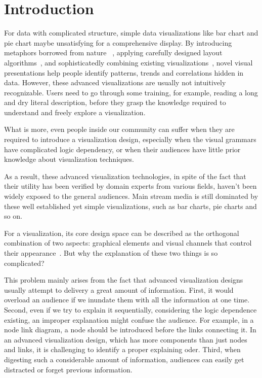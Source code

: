 
\section{Introduction} %
For data with complicated structure, simple data visualizations like bar chart and pie chart maybe unsatisfying for a comprehensive display. By introducing metaphors borrowed from nature ~\cite{cao_whisper:_2012,huron_visual_2013}, applying carefully designed layout algorithms~\cite{wu_opinionflow:_2014,chi_morphable_2015}, and sophisticatedly combining existing visualizations~\cite{zhao_x0023;fluxflow:_2014}, novel visual presentations help people identify patterns, trends and correlations hidden in data. However, these advanced visualizations are usually not intuitively recognizable. Users need to go through some training, for example, reading a long and dry literal description, before they grasp the knowledge required to understand and freely explore a visualization.\par
What is more, even people inside our community can suffer when they are required to introduce a visualization design, especially when the visual grammars have complicated logic dependency, or when their audiences have little prior knowledge about visualization techniques.\par
As a result, these advanced visualization technologies, in spite of
the fact that their utility has been verified by domain experts from various fields, haven't been widely exposed to the general audiences. Main stream media is still dominated by these well established yet simple visualizations, such as bar charts, pie charts and so on.

For a visualization, its core design space can be described as the orthogonal combination of two aspects: graphical elements and visual channels that control their appearance~\cite{munzner_visualization_2014}. But why the explanation of these two things is so complicated? 

This problem mainly arises from the fact that advanced visualization designs usually attempt to delivery a great amount of information. First, it would overload an audience if we inundate them with all the information at one time. Second, even if we try to explain it sequentially, considering the logic dependence existing, an improper explanation might confuse the audience. For example, in a node link diagram, a node should be introduced before the links connecting it. In an advanced visualization design, which has more components than just nodes and links, it is challenging to identify a proper explaining oder. Third, when digesting such a considerable amount of information, audiences can easily get distracted or forget previous information.   

